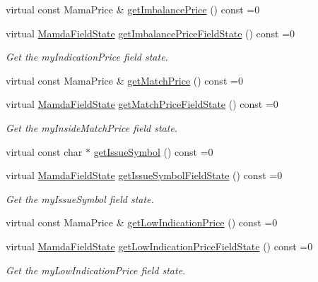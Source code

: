 \begin{CompactItemize}
virtual const Mama\-Price \& \hyperlink{classWombat_1_1MamdaOrderImbalanceRecap_2de9b81042cfa08034717b7930d436f0}{get\-Imbalance\-Price} () const =0
\item 
virtual \hyperlink{namespaceWombat_93aac974f2ab713554fd12a1fa3b7d2a}{Mamda\-Field\-State} \hyperlink{classWombat_1_1MamdaOrderImbalanceRecap_0ac5312b01a0b1bf7f3347332280a6dd}{get\-Imbalance\-Price\-Field\-State} () const =0
\begin{CompactList}\small\item\em Get the my\-Indication\-Price field state. \item\end{CompactList}\item 
virtual const Mama\-Price \& \hyperlink{classWombat_1_1MamdaOrderImbalanceRecap_fd8f72c21ac091a298c09bde0d4ed146}{get\-Match\-Price} () const =0
\item 
virtual \hyperlink{namespaceWombat_93aac974f2ab713554fd12a1fa3b7d2a}{Mamda\-Field\-State} \hyperlink{classWombat_1_1MamdaOrderImbalanceRecap_3f065a9bdc4535525b7f4842f997ce9c}{get\-Match\-Price\-Field\-State} () const =0
\begin{CompactList}\small\item\em Get the my\-Inside\-Match\-Price field state. \item\end{CompactList}\item 
virtual const char $\ast$ \hyperlink{classWombat_1_1MamdaOrderImbalanceRecap_7a63844c647b4b13d5f2d07f5e27d719}{get\-Issue\-Symbol} () const =0
\item 
virtual \hyperlink{namespaceWombat_93aac974f2ab713554fd12a1fa3b7d2a}{Mamda\-Field\-State} \hyperlink{classWombat_1_1MamdaOrderImbalanceRecap_955e7f821258342ee01c9d897f6c3d34}{get\-Issue\-Symbol\-Field\-State} () const =0
\begin{CompactList}\small\item\em Get the my\-Issue\-Symbol field state. \item\end{CompactList}\item 
virtual const Mama\-Price \& \hyperlink{classWombat_1_1MamdaOrderImbalanceRecap_b5dda63ec532e8d11a6a07a380d5470f}{get\-Low\-Indication\-Price} () const =0
\item 
virtual \hyperlink{namespaceWombat_93aac974f2ab713554fd12a1fa3b7d2a}{Mamda\-Field\-State} \hyperlink{classWombat_1_1MamdaOrderImbalanceRecap_7e2c182069b4e4ec378447998ee72819}{get\-Low\-Indication\-Price\-Field\-State} () const =0
\begin{CompactList}\small\item\em Get the my\-Low\-Indication\-Price field state. \item\end{CompactList}\item 

\end{CompactItemize}
